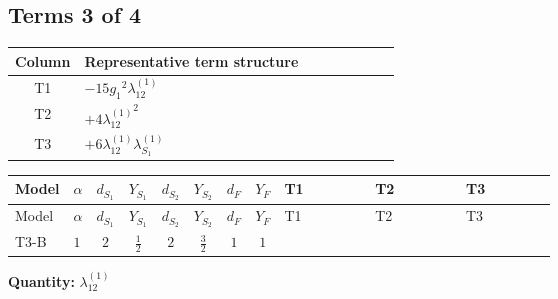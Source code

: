 \documentclass[8pt]{article}
\begin{document}
\begin{landscape}
\subsection*{Terms 3 of 4}
\begin{center}
\begin{tabular}{@{}c >{\raggedright\arraybackslash}p{0.82\linewidth}@{}}
\toprule
Column & Representative term structure \\
\midrule
T1 & \(\displaystyle -15 {g_1}^2 {\lambda_{12}^{(1)}}\) \\
\midrule
T2 & \(\displaystyle +4 {\lambda_{12}^{(1)}}^2\) \\
\midrule
T3 & \(\displaystyle +6 {\lambda_{12}^{(1)}} {\lambda_{S_1}^{(1)}}\) \\
\midrule
\bottomrule
\end{tabular}
\end{center}
\smallskip
\tiny
\begin{longtable}{@{}llcccccc >{\raggedright\arraybackslash}p{0.21\linewidth} >{\raggedright\arraybackslash}p{0.21\linewidth} >{\raggedright\arraybackslash}p{0.21\linewidth}@{}}
\toprule
Model & $\alpha$ & $d_{S_1}$ & $Y_{S_1}$ & $d_{S_2}$ & $Y_{S_2}$ & $d_F$ & $Y_F$ & T1 & T2 & T3 \\
\midrule
\endfirsthead
\toprule
Model & $\alpha$ & $d_{S_1}$ & $Y_{S_1}$ & $d_{S_2}$ & $Y_{S_2}$ & $d_F$ & $Y_F$ & T1 & T2 & T3 \\
\midrule
\endhead
T3-B & $1$ & $2$ & $\frac{1}{2}$ & $2$ & $\frac{3}{2}$ & $1$ & $1$ & \scriptsize\adjustbox{max width=\linewidth}{$\begin{gathered} -15 {g_1}^2 {\lambda_{12}^{(1)}}\end{gathered}$} & \scriptsize\adjustbox{max width=\linewidth}{$\begin{gathered} +4 {\lambda_{12}^{(1)}}^2\end{gathered}$} & \scriptsize\adjustbox{max width=\linewidth}{$\begin{gathered} +6 {\lambda_{12}^{(1)}} {\lambda_{S_1}^{(1)}}\end{gathered}$} \\
\midrule
\bottomrule
\end{longtable}
\clearpage
\noindent\textbf{Quantity: }$\lambda_{12}^{(1)}$\par\smallskip

\end{landscape}
\end{document}
